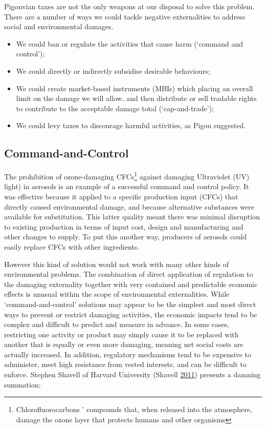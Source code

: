 \documentclass[]{tufte-handout}
\providecommand{\tightlist}{%
  \setlength{\itemsep}{0pt}\setlength{\parskip}{0pt}}
\begin{document}
Pigouvian taxes are not the only weapons at our disposal to solve this
problem. There are a number of ways we could tackle negative
externalities to address social and environmental damages.

\begin{itemize}
\tightlist
\item
  We could ban or regulate the activities that cause harm (`command and
  control');
\item
  We could directly or indirectly subsidise desirable behaviours;
\item
  We could create market-based instruments (MBIs) which placing an
  overall limit on the damage we will allow, and then distribute or sell
  tradable rights to contribute to the acceptable damage total
  (`cap-and-trade');
\item
  We could levy taxes to discourage harmful activities, as Pigou
  suggested.
\end{itemize}

\hypertarget{command-and-control}{%
\subsection{Command-and-Control}\label{command-and-control}}

The prohibition of ozone-damaging CFCs\footnote{Chlorofluorocarbons '
  compounds that, when released into the atmosphere, damage the ozone
  layer that protects humans and other organisms} against damaging
Ultraviolet (UV) light) in aerosols is an example of a successful
command and control policy. It was effective because it applied to a
specific production input (CFCs) that directly caused environmental
damage, and because alternative substances were available for
substitution. This latter quality meant there was minimal disruption to
existing production in terms of input cost, design and manufacturing and
other changes to supply. To put this another way, producers of aerosols
could easily replace CFCs with other ingredients.

However this kind of solution would not work with many other kinds of
environmental problems. The combination of direct application of
regulation to the damaging externality together with very contained and
predictable economic effects is unusual within the scope of
environmental externalities. While `command-and-control' solutions may
appear to be the simplest and most direct ways to prevent or restrict
damaging activities, the economic impacts tend to be complex and
difficult to predict and measure in advance. In some cases, restricting
one activity or product may simply cause it to be replaced with another
that is equally or even more damaging, meaning net social costs are
actually increased. In addition, regulatory mechanisms tend to be
expensive to administer, meet high resistance from vested interests, and
can be difficult to enforce. Stephen Shavell of Harvard University
(Shavell \protect\hyperlink{ref-Shavell2011}{2011}) presents a damning
summation:
\end{document}
